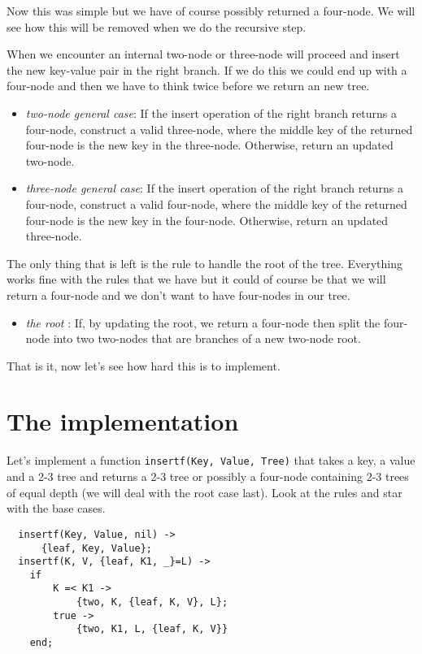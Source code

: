 \documentclass[a4paper,11pt]{article}
\begin{document}
Now this was simple but we have of course possibly returned a
four-node. We will see how this will be removed when we do the
recursive step.

When we encounter an internal two-node or three-node will proceed and
insert the new key-value pair in the right branch. If we do this we
could end up with a four-node and then we have to think twice before
we return an new tree.

\begin{itemize}
\item {\em two-node general case}: If the insert operation of the right branch returns a four-node, construct a valid three-node, where the middle key of the returned four-node is the new key in the three-node. Otherwise, return an updated two-node.

\item {\em three-node general case}: If the insert operation of the right branch returns a four-node, construct a valid four-node, where the middle key of the returned four-node is the new key in the four-node. Otherwise, return an updated three-node.
\end{itemize}

The only thing that is left is the rule to handle the root of the
tree. Everything works fine with the rules that we have but it could
of course be that we will return a four-node and we don't want to have
four-nodes in our tree.

\begin{itemize}
\item {\em the root} : If, by updating the root, we return a four-node
  then split the four-node into two two-nodes that are branches of a
  new two-node root.
\end{itemize}

That is it, now let's see how hard this is to implement.

\section{The implementation}

Let's implement a function {\tt insertf(Key, Value, Tree)} that takes a
key, a value and a 2-3 tree and returns a 2-3 tree or possibly a
four-node containing 2-3 trees of equal depth (we will deal with the
root case last). Look at the rules and star with the base cases.

\begin{lstlisting}
  insertf(Key, Value, nil) ->
      {leaf, Key, Value};
  insertf(K, V, {leaf, K1, _}=L) ->
    if
        K =< K1 ->
            {two, K, {leaf, K, V}, L};
        true ->
            {two, K1, L, {leaf, K, V}}
    end;
\end{lstlisting}
\end{document}
